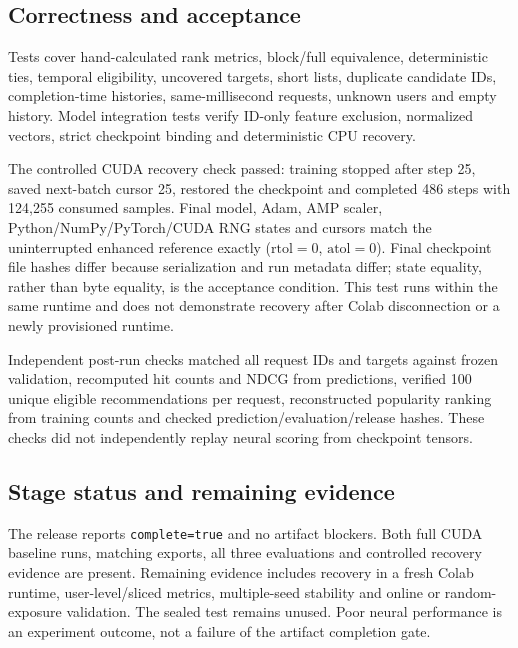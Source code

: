 \documentclass[11pt,a4paper]{article}
\begin{document}
\subsection{Correctness and acceptance}
Tests cover hand-calculated rank metrics, block/full equivalence, deterministic ties, temporal eligibility, uncovered targets, short lists, duplicate candidate IDs, completion-time histories, same-millisecond requests, unknown users and empty history. Model integration tests verify ID-only feature exclusion, normalized vectors, strict checkpoint binding and deterministic CPU recovery.

The controlled CUDA recovery check passed: training stopped after step 25, saved next-batch cursor 25, restored the checkpoint and completed 486 steps with 124,255 consumed samples. Final model, Adam, AMP scaler, Python/NumPy/PyTorch/CUDA RNG states and cursors match the uninterrupted enhanced reference exactly ($\mathrm{rtol}=0$, $\mathrm{atol}=0$). Final checkpoint file hashes differ because serialization and run metadata differ; state equality, rather than byte equality, is the acceptance condition. This test runs within the same runtime and does not demonstrate recovery after Colab disconnection or a newly provisioned runtime.

Independent post-run checks matched all request IDs and targets against frozen validation, recomputed hit counts and NDCG from predictions, verified 100 unique eligible recommendations per request, reconstructed popularity ranking from training counts and checked prediction/evaluation/release hashes. These checks did not independently replay neural scoring from checkpoint tensors.

\subsection{Stage status and remaining evidence}
The release reports \texttt{complete=true} and no artifact blockers. Both full CUDA baseline runs, matching exports, all three evaluations and controlled recovery evidence are present. Remaining evidence includes recovery in a fresh Colab runtime, user-level/sliced metrics, multiple-seed stability and online or random-exposure validation. The sealed test remains unused. Poor neural performance is an experiment outcome, not a failure of the artifact completion gate.
\clearpage
\end{document}
